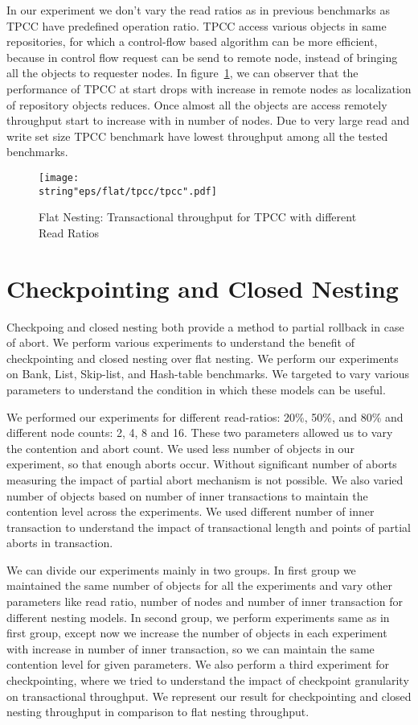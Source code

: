 \documentclass[12pt,english]{report}
\begin{document}
In our experiment we don't vary the read ratios as in previous benchmarks as TPCC have predefined operation ratio. TPCC access various objects in same repositories, for which a control-flow based algorithm can be more efficient, because in control flow request can be send to remote node, instead of bringing all the objects to requester nodes. In figure~\ref{Fig:flatTPCC}, we can observer that the performance of TPCC at start drops with increase in remote nodes as localization of repository objects reduces. Once almost all the objects are access remotely throughput start to increase with in number of nodes. Due to very large read and write set size TPCC benchmark have lowest throughput among all the tested benchmarks.

\begin{figure}[H]
\centering
\texttt{[image: \\string"eps/flat/tpcc/tpcc".pdf]}
\caption{Flat Nesting: Transactional throughput for TPCC with different Read Ratios}
\label{Fig:flatTPCC}
\end{figure}

\section{Checkpointing and Closed Nesting}

Checkpoing and closed nesting both provide a method to partial rollback in case of abort. We perform various experiments to understand the benefit of checkpointing and closed nesting over flat nesting. We perform our experiments on Bank, List, Skip-list, and Hash-table benchmarks. We targeted to vary various parameters to understand the condition in which these models can be useful.

We performed our experiments for different read-ratios: 20\%, 50\%, and 80\% and different node counts: 2, 4, 8 and 16. These two parameters allowed us to vary the contention and abort count. We used less number of objects in our experiment, so that enough aborts occur. Without significant number of aborts measuring the impact of partial abort mechanism is not possible. We also varied number of objects based on number of inner transactions to maintain the contention level across the experiments. We used different number of inner transaction to understand the impact of transactional length and points of partial aborts in transaction.

We can divide our experiments mainly in two groups. In first group we maintained the same number of objects for all the experiments and vary other parameters like read ratio, number of nodes and number of inner transaction for different nesting models. In second group, we perform experiments same as in first group, except now we increase the number of objects in each experiment with increase in number of inner transaction, so we can maintain the same contention level for given parameters. We also perform a third experiment for checkpointing, where we tried to understand the impact of checkpoint granularity on transactional throughput. We represent our result for checkpointing and closed nesting throughput in comparison to flat nesting throughput.
\end{document}
